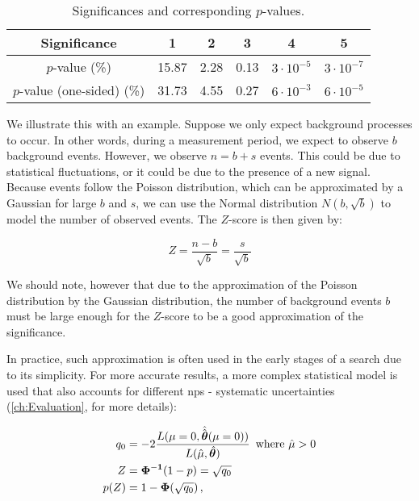 \begin{table}[htb]
    \centering
    \begin{tabular}{|c|c|c|c|c|c|}
        \hline
        Significance               & 1     & 2    & 3    & 4                 & 5                 \\
        \hline
        \rule{0pt}{15pt}
        $p$-value (\%)             & 15.87 & 2.28 & 0.13 & $3 \cdot 10^{-5}$ & $3 \cdot 10^{-7}$ \\
        \hline
        \rule{0pt}{15pt}
        $p$-value (one-sided) (\%) & 31.73 & 4.55 & 0.27 & $6\cdot 10^{-3}$  & $6 \cdot 10^{-5}$ \\
        \hline
    \end{tabular}
    \caption{Significances and corresponding $p$-values.}
    \label{tab:significance}
\end{table}

We illustrate this with an example. Suppose we only expect background processes to occur. In other words, during a
measurement period, we expect to observe $b$ background events. However, we observe $n=b+s$ events. This
could be due to statistical fluctuations, or it could be due to the presence of a new signal. Because events follow the
Poisson distribution, which can be approximated by a Gaussian for large $b$ and $s$, we can use the Normal distribution
$N(b, \sqrt{b})$ to model the number of observed events. The $Z$-score is then given by:

\begin{equation}
    Z = \frac{n-b}{\sqrt{b}} = \frac{s}{\sqrt{b}}
\end{equation}

We should note, however that due to the approximation of the Poisson distribution by the Gaussian distribution, the
number of background events $b$ must be large enough for the $Z$-score to be a good approximation of the significance.

In practice, such approximation is often used in the early stages of a search due to its simplicity. For more accurate
results, a more complex statistical model is used that also accounts for different \glspl{np} - systematic
uncertainties (\autoref{ch:Evaluation}, \cite{pract-stat-lhc, statistical} for more details):

\begin{align}
    q_0  & = -2 \frac{L(\mu=0, \hat{\hat{\bm{\theta}}}(\mu=0))}{L(\hat{\mu}, \hat{\bm{\theta}})} \, \text{ where $\hat{\mu} > 0$} \\
    Z    & = \mathbf{\Phi^{-1}}(1 - p) = \sqrt{q_0}                                                                                          \\
    p(Z) & = 1 - \mathbf{\Phi}(\sqrt{q_0})\,,
\end{align}

